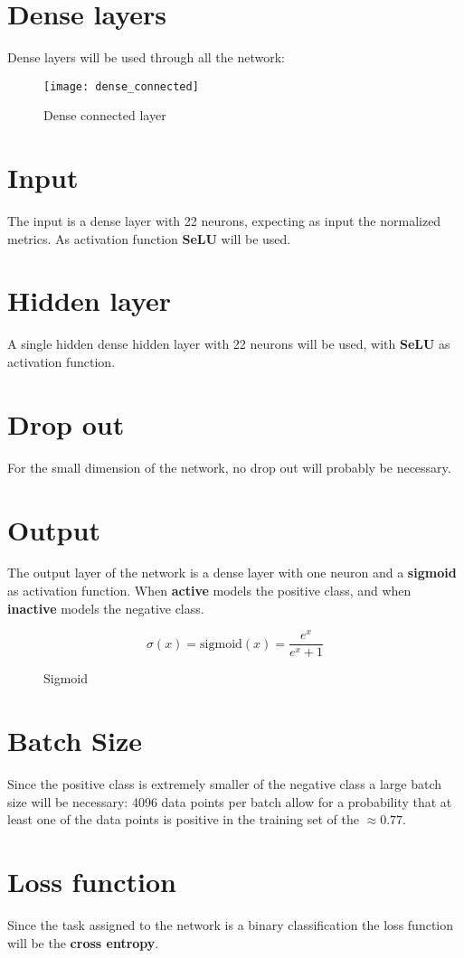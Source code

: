 \section{Dense layers}
Dense layers will be used through all the network:
\begin{figure}
	\texttt{[image: dense\_connected]}
	\caption{Dense connected layer}
\end{figure}

\section{Input}
The input is a dense layer with 22 neurons, expecting as input the normalized metrics. As activation function \textbf{SeLU} will be used.

\section{Hidden layer}
A single hidden dense hidden layer with 22 neurons will be used, with \textbf{SeLU} as activation function.

\section{Drop out}
For the small dimension of the network, no drop out will probably be necessary.

\section{Output}
The output layer of the network is a dense layer with one neuron and a \textbf{sigmoid} as activation function. When \textbf{active} models the positive class, and when \textbf{inactive} models the negative class.

\begin{figure}
	\[
		\sigma(x) = \text{sigmoid}(x) = \frac{e^x}{e^x + 1}
	\]
	\caption{Sigmoid}
\end{figure}

\section{Batch Size}
Since the positive class is extremely smaller of the negative class a large batch size will be necessary: 4096 data points per batch allow for a probability that at least one of the data points is positive in the training set of the \(\approx0.77\).

\section{Loss function}
Since the task assigned to the network is a binary classification the loss function will be the \textbf{cross entropy}.

